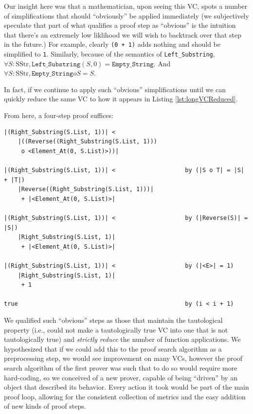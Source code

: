 Our insight here was that a mathematician, upon seeing this VC, spots a number of simplifications that should ``obviously'' be applied immediately (we subjectively speculate that part of what qualifies a proof step as ``obvious'' is the intuition that there's an extremely low liklihood we will wish to backtrack over that step in the future.)  For example, clearly \texttt{(0 + 1)} adds nothing and should be simplified to \texttt{1}.  Similarly, because of the semantics of \texttt{Left\_Substring}, $\forall S : \text{SStr}, \texttt{Left\_Substring}(S, 0) = \texttt{Empty\_String}$.  And $\forall S : \text{SStr}, \texttt{Empty\_String} o S = S$.

In fact, if we continue to apply such ``obvious'' simplifications until we can quickly reduce the same VC to how it appears in Listing \ref{lst:longVCReduced}.



From here, a four-step proof suffices:

\begin{lstlisting}
|(Right_Substring(S.List, 1))| < 
	|((Reverse((Right_Substring(S.List, 1)))
	 o <Element_At(0, S.List)>))|

|(Right_Substring(S.List, 1))| <                    by (|S o T| = |S| + |T|)
	|Reverse((Right_Substring(S.List, 1)))|
	 + |<Element_At(0, S.List)>|

|(Right_Substring(S.List, 1))| <                    by (|Reverse(S)| = |S|)
	|Right_Substring(S.List, 1)|
	 + |<Element_At(0, S.List)>|

|(Right_Substring(S.List, 1))| <                    by (|<E>| = 1)
	|Right_Substring(S.List, 1)|
	 + 1

true                                                by (i < i + 1)
\end{lstlisting}

We qualified such ``obvious'' steps as those that maintain the tautological property (i.e., could not make a tautologically true VC into one that is not tautologically true) and \emph{strictly reduce} the number of function applications.  We hypothesized that if we could add this to the proof search algorithm as a preprocessing step, we would see improvement on many VCs, however the proof search algorithm of the first prover was such that to do so would require more hard-coding, so we conceived of a new prover, capable of being ``driven'' by an object that described its behavior.  Every action it took would be part of the main proof loop, allowing for the consistent collection of metrics and the easy addition of new kinds of proof steps.

